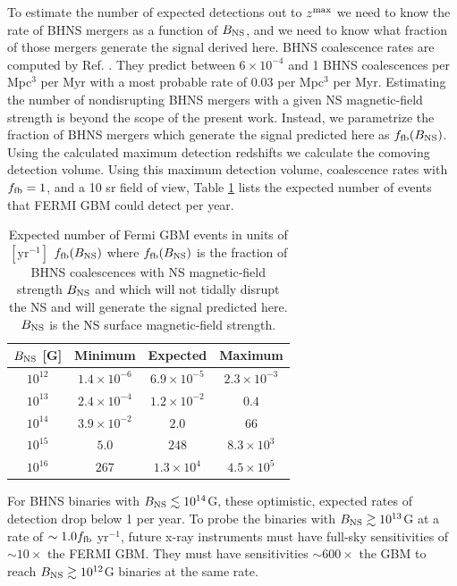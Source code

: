 To estimate the number of expected detections out to $z^{\rm{max}}$ we
need to know the rate of BHNS mergers as a function of $B_{\rm{NS}}$,
and we need to know what fraction of those mergers generate the signal
derived here. BHNS coalescence rates are computed by
Ref. \cite{LIGORates:2010}. They predict between $6 \times 10^{-4}$
and 1 BHNS coalescences per Mpc$^3$ per Myr with a most probable rate
of $0.03$ per Mpc$^3$ per Myr. Estimating the number of nondisrupting
BHNS mergers with a given NS magnetic-field strength is beyond the
scope of the present work. Instead, we parametrize the fraction of
BHNS mergers which generate the signal predicted here as $f_{\rm
  fb}(B_{\rm{NS}})$. Using the calculated maximum detection redshifts
we calculate the comoving detection volume. Using this maximum
detection volume, coalescence rates with $f_{\rm fb} = 1$, and a 10 sr
field of view, Table \ref{Tab:Rates} lists the expected number of
events that FERMI GBM could detect per year.
\begin{table}
\begin{center}
\begin{tabular}{ c | c | c | c }
%
    $B_{\rm{NS}}$  [G]       & Minimum              & Expected 			    & Maximum   \\
                   \hline 
 $10^{12}$  &   $1.4 \times 10^{-6}$      & $6.9 \times 10^{-5}$     & $2.3 \times 10^{-3}$  \\
 $10^{13}$  &   $ 2.4 \times 10^{-4}$     & $1.2 \times 10^{-2}$     & $0.4$  \\
$10^{14}$  &   $3.9 \times 10^{-2}$       & $2.0$			          & $66$	\\
$10^{15}$  &   $5.0$                              & $248$     		          & $8.3 \times 10^{3}$   \\
$10^{16}$  &   $267$                             & $1.3 \times 10^{4}$       & $4.5 \times 10^{5}$	 
%
 \end{tabular}
\caption{Expected number of Fermi GBM events in units of
  $\left[\mbox{yr}^{-1}\right]$ $f_{\rm fb}(B_{\rm{NS}})$ where
  $f_{\rm fb}(B_{\rm{NS}})$ is the fraction of BHNS coalescences with
  NS magnetic-field strength $B_{\rm{NS}}$ and which will not tidally
  disrupt the NS and will generate the signal predicted here. $B_{\rm{NS}}$
  is the NS surface magnetic-field strength.}
\label{Tab:Rates}
\end{center}
\end{table}

For BHNS binaries with $B_{\rm{NS}} \lesssim 10^{14}$G, these
optimistic, expected rates of detection drop below 1 per year. To
probe the binaries with $B_{\rm{NS}} \gtrsim 10^{13}$G at a rate of
$\sim 1.0 f_{\rm{fb}}$ yr$^{-1}$, future x-ray instruments must have
full-sky sensitivities of $\sim10\times$ the FERMI GBM. They must have
sensitivities $\sim600\times$ the GBM to reach $B_{\rm{NS}} \gtrsim
10^{12}$G binaries at the same rate.

